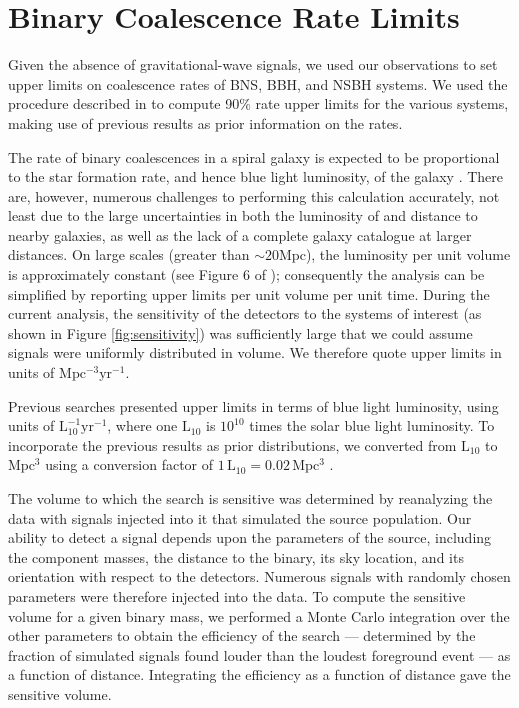 \documentclass[prd,superscriptaddress,showpacs,amssymb,amsmath,amsfonts,aps,altaffilletter,nofootinbib,letterpaper,twocolumn]{revtex4}
\def\12to18{Abbott:2009qj}
\def\sfive1yr{Collaboration:2009tt}
\def\sfivelvc{S5LowMassLV}
\begin{document}
\section{Binary Coalescence Rate Limits}
\label{sec:ul}

Given the absence of gravitational-wave signals, we used our observations
to set upper limits on coalescence rates of \ac{BNS}, \ac{BBH}, and
\ac{NSBH} systems.  We used the procedure described in
\cite{Fairhurst:2007qj,loudestGWDAW03,Biswas:2007ni} to compute 90\%
rate upper limits for the various systems, making use of previous
results \cite{\sfive1yr,\12to18,\sfivelvc} as prior information on the
rates.

The rate of binary coalescences in a spiral galaxy is expected to be
proportional to the star formation rate, and hence blue light luminosity, of
the galaxy \cite{LIGOS3S4Galaxies}. There are, however, numerous challenges to
performing this calculation accurately, not least due to the large
uncertainties in both the luminosity of and distance to nearby galaxies, as well
as the lack of a complete galaxy catalogue at larger distances.  On large
scales (greater than $\sim 20\mathrm{Mpc}$), the luminosity per unit volume is
approximately constant (see Figure 6 of \cite{LIGOS3S4Galaxies}); consequently
the analysis can be simplified by reporting upper limits per unit volume per
unit time.  During the current analysis, the sensitivity of the detectors to
the systems of interest (as shown in Figure \ref{fig:sensitivity}) was
sufficiently large that we could assume signals were uniformly distributed in
volume. We therefore quote upper limits in units of $\mathrm{Mpc^{-3}yr^{-1}}$.

Previous searches \cite{\sfive1yr,\12to18,\sfivelvc} presented upper limits in
terms of blue light luminosity, using units of $\mathrm{L_{10}^{-1}yr^{-1}}$,
where one $\mathrm{L_{10}}$ is $10^{10}$ times the solar blue light luminosity.  To
incorporate the previous results as prior distributions, we converted from
$\mathrm{L_{10}}$ to $\mathrm{Mpc^3}$ using a conversion factor of $1 \,
\mathrm{L_{10}} = 0.02 \, \mathrm{Mpc^3}$ \cite{LIGOS3S4Galaxies}.

The volume to which the search is sensitive was determined by reanalyzing the
data with signals injected into it that simulated the source population. Our
ability to detect a signal depends upon the parameters of the source, including
the component masses, the distance to the binary, its sky location, and its
orientation with respect to the detectors. Numerous signals with randomly
chosen parameters were therefore injected into the data. To compute the
sensitive volume for a given binary mass, we performed a Monte Carlo
integration over the other parameters to obtain the efficiency of the search
--- determined by the fraction of simulated signals found louder than the
loudest foreground event --- as a function of distance. Integrating the
efficiency as a function of distance gave the sensitive volume.
\end{document}
